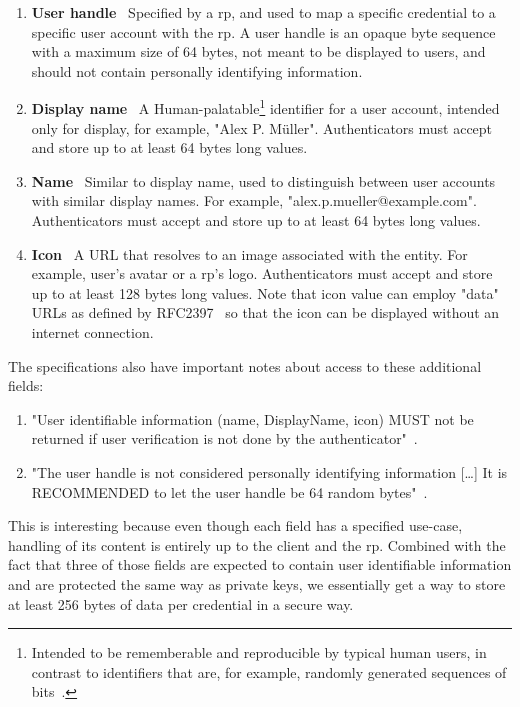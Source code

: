 \begin{enumerate}
	\item \textbf{User handle} \textendash\ Specified by a \gls{rp}, and used to map a specific credential to a specific user account with the \gls{rp}. A user handle is an opaque byte sequence with a maximum size of 64 bytes, not meant to be displayed to users, and should not contain personally identifying information.
	\item \textbf{Display name} \textendash\ A Human-palatable\footnote{Intended to be rememberable and reproducible by typical human users, in contrast to identifiers that are, for example, randomly generated sequences of bits~\cite{eduperson-ocl}.} identifier for a user account, intended only for display, for example, "Alex P. Müller". Authenticators must accept and store up to at least 64 bytes long values.
	\item \textbf{Name} \textendash\ Similar to display name, used to distinguish between user accounts with similar display names. For example, "alex.p.mueller\allowbreak @example.com". Authenticators must accept and store up to at least 64 bytes long values.
	\item \textbf{Icon} \textendash\ A URL that resolves to an image associated with the entity. For example, user's avatar or a \gls{rp}'s logo. Authenticators must accept and store up to at least 128 bytes long values. Note that icon value can employ "data" URLs as defined by RFC2397~\cite{rfc2397} so that the icon can be displayed without an internet connection.
\end{enumerate}

The specifications also have important notes about access to these additional fields:

\begin{enumerate}
	\item "User identifiable information (name, DisplayName, icon) MUST not be returned if user verification is not done by the authenticator"~\cite{fido:ctap}.
	\item "The user handle is not considered personally identifying information [\ldots] It is RECOMMENDED to let the user handle be 64 random bytes"~\cite{fido:webautn}.
\end{enumerate}

This is interesting because even though each field has a specified use-case, handling of its content
is entirely up to the \gls{client} and the \gls{rp}. Combined with the fact that three of those fields
are expected to contain user identifiable information and are protected the same way as private keys,
we essentially get a way to store at least 256 bytes of data per credential in a secure way.


